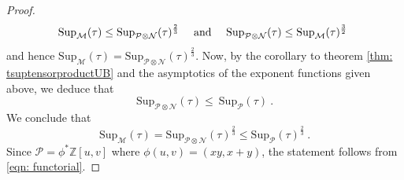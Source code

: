 \documentclass[a4paper,10pt]{amsart}
\theoremstyle{definition}
\theoremstyle{remark}
\numberwithin{equation}{section}
\newcommand{\Z}{\mathbb Z}
\newcommand{\ts}{\mathrm{Sup}}
\newcommand{\rank}{\mathrm{rank}}
\newcommand{\0}{\color{blue}{\mathsf{0}}}
\begin{document}
\begin{proof}
\[    \ts_{\mathcal{M}}(\tau) \leq  \ts_{\mathcal{P} \otimes \mathcal{N}}(\tau)^{\frac{2}{3}} \quad \hbox{ and } \quad  \ts_{\mathcal{P} \otimes \mathcal{N}}(\tau)  \leq  \ts_{\mathcal{M}}(\tau)^{\frac{3}{2}}   \  \]  
 and hence $ \ts_{\mathcal{M}}(\tau) =  \ts_{\mathcal{P} \otimes \mathcal{N}}(\tau)^{\frac{2}{3}} $. 
  Now, by the corollary to theorem \ref{thm: tsuptensorproductUB}  and the asymptotics of the exponent functions given above, we deduce that 
 \[  \ts_{\mathcal{P}\otimes \mathcal{N}}(\tau)  \leq   \ \ts_{\mathcal{P}} (\tau ) \ .  \]
 We conclude that 
\[ \ts_{\mathcal{M}}(\tau) =  \ts_{\mathcal{P} \otimes \mathcal{N}}(\tau)^{\frac{2}{3}} \leq     \ts_{\mathcal{P}}(\tau)^{\frac{2}{3}} \ . \] 
Since $\mathcal{P}= \phi^* \Z[u,v]$ where $\phi(u,v) = (xy, x+y)$,  the statement follows from \eqref{eqn: functorial}. 
 \end{proof}
\end{document}
